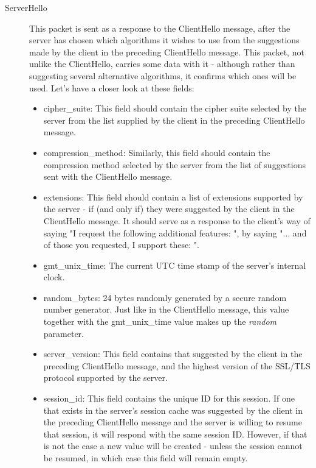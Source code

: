 \begin{description}
	\item[ServerHello]\cite{rfcServerHello,rfcSSLServerHello} This packet is sent as a response to the ClientHello message, after the server has chosen which algorithms it wishes to use from the suggestions made by the client in the preceding ClientHello message. This packet, not unlike the ClientHello, carries some data with it - although rather than suggesting several alternative algorithms, it confirms which ones will be used. Let's have a closer look at these fields:
	\begin{itemize}
		\item cipher\_suite: This field should contain the cipher suite selected by the server from the list supplied by the client in the preceding ClientHello message.
		\item compression\_method: Similarly, this field should contain the compression method selected by the server from the list of suggestions sent with the ClientHello message.
		
		\item extensions: This field should contain a list of extensions supported by the server - if (and only if) they were suggested by the client in the ClientHello message. It should serve as a response to the client's way of saying "I request the following additional features: ", by saying "... and of those you requested, I support these: ".
		
		\item gmt\_unix\_time: The current UTC time stamp of the server's internal clock.
		\item random\_bytes: 24 bytes randomly generated by a secure random number generator. Just like in the ClientHello message, this value together with the gmt\_unix\_time value makes up the \textit{random} parameter.
		
		\item server\_version: This field contains that suggested by the client in the preceding ClientHello message, and the highest version of the SSL/TLS protocol supported by the server.
		 
		\item session\_id: This field contains the unique ID for this session. If one that exists in the server's session cache was suggested by the client in the preceding ClientHello message and the server is willing to resume that session, it will respond with the same session ID. However, if that is not the case a new value will be created - unless the session cannot be resumed, in which case this field will remain empty. 
	\end{itemize}
	

\end{description}

